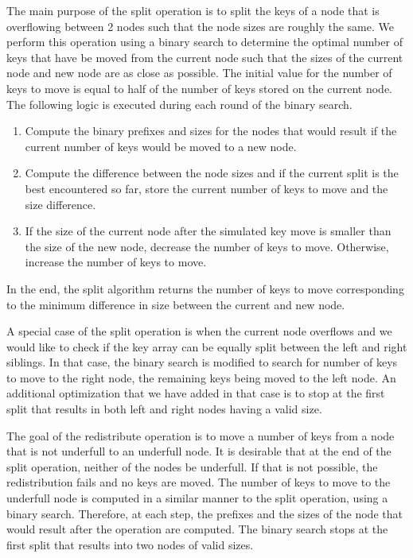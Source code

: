 \documentclass[11pt,a4paper,oneside]{article}
\begin{document}
The main purpose of the split operation is to split the keys of a node that is overflowing between 2 nodes such that the node sizes are roughly the same. We perform this operation using a binary search to determine the optimal number of keys that have be moved from the current node such that the sizes of the current node and new node are as close as possible. The initial value for the number of keys to move is equal to half of the number of keys stored on the current node. The following logic is executed during each round of the binary search. 
\begin{enumerate}
	\item Compute the binary prefixes and sizes for the nodes that would result if the current number of keys would be moved to a 
	new node. 
	\item Compute the difference between the node sizes and if the current split is the best encountered so far, store the current number of keys to move and the size difference.
	\item If the size of the current node after the simulated key move is smaller than the size of the new node, decrease the number of keys to move. Otherwise, increase the number of keys to move.
\end{enumerate}
In the end, the split algorithm returns the number of keys to move corresponding to the minimum difference in size between the current and new node.

A special case of the split operation is when the current node overflows and we would like to check if the key array can be equally split between the left and right siblings. In that case, the binary search is modified to search for number of keys to move to the right node, the remaining keys being moved to the left node. An additional optimization that we have added in that case is to stop at the first split that results in both left and right nodes having a valid size.

The goal of the redistribute operation is to move a number of keys from a node that is not underfull to an underfull node. It is desirable that at the end of the split operation, neither of the nodes be underfull. If that is not possible, the redistribution fails and no keys are moved. The number of keys to move to the underfull node is computed in a similar manner to the split operation, using a binary search. Therefore, at each step, the prefixes and the sizes of the node that would result after the operation are computed. The binary search stops at the first split that results into two nodes of valid sizes.
\end{document}
